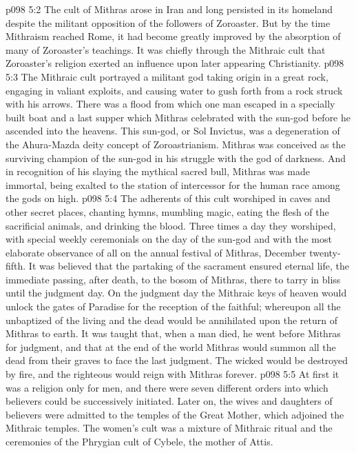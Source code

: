 \vs p098 5:2 The cult of Mithras arose in Iran and long persisted in its homeland despite the militant opposition of the followers of Zoroaster. But by the time Mithraism reached Rome, it had become greatly improved by the absorption of many of Zoroaster’s teachings. It was chiefly through the Mithraic cult that Zoroaster’s religion exerted an influence upon later appearing Christianity.
\vs p098 5:3 \pc The Mithraic cult portrayed a militant god taking origin in a great rock, engaging in valiant exploits, and causing water to gush forth from a rock struck with his arrows. There was a flood from which one man escaped in a specially built boat and a last supper which Mithras celebrated with the sun\hyp{}god before he ascended into the heavens. This sun\hyp{}god, or Sol Invictus, was a degeneration of the Ahura\hyp{}Mazda deity concept of Zoroastrianism. Mithras was conceived as the surviving champion of the sun\hyp{}god in his struggle with the god of darkness. And in recognition of his slaying the mythical sacred bull, Mithras was made immortal, being exalted to the station of intercessor for the human race among the gods on high.
\vs p098 5:4 The adherents of this cult worshiped in caves and other secret places, chanting hymns, mumbling magic, eating the flesh of the sacrificial animals, and drinking the blood. Three times a day they worshiped, with special weekly ceremonials on the day of the sun\hyp{}god and with the most elaborate observance of all on the annual festival of Mithras, December twenty\hyp{}fifth. It was believed that the partaking of the sacrament ensured eternal life, the immediate passing, after death, to the bosom of Mithras, there to tarry in bliss until the judgment day. On the judgment day the Mithraic keys of heaven would unlock the gates of Paradise for the reception of the faithful; whereupon all the unbaptized of the living and the dead would be annihilated upon the return of Mithras to earth. It was taught that, when a man died, he went before Mithras for judgment, and that at the end of the world Mithras would summon all the dead from their graves to face the last judgment. The wicked would be destroyed by fire, and the righteous would reign with Mithras forever.
\vs p098 5:5 At first it was a religion only for men, and there were seven different orders into which believers could be successively initiated. Later on, the wives and daughters of believers were admitted to the temples of the Great Mother, which adjoined the Mithraic temples. The women’s cult was a mixture of Mithraic ritual and the ceremonies of the Phrygian cult of Cybele, the mother of Attis.
